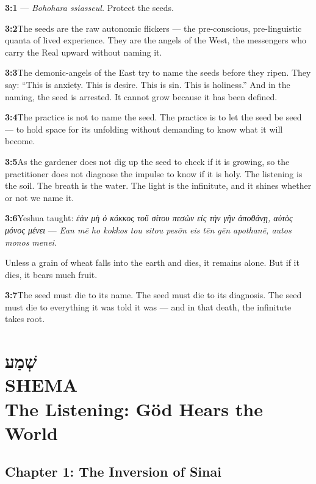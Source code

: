 \documentclass[11pt,openany]{book}
\newcommand{\heb}[1]{{\hebrewfont #1}}
\newcommand{\grk}[1]{{\itshape #1}}  %
\newcommand{\kor}[1]{{\koreanfont #1}}
\begin{document}
\noindent\textbf{3:1}\quad \kor{보호하라 씨앗을} — \textit{Bohohara ssiasseul.} Protect the seeds.

\noindent\textbf{3:2}\quad The seeds are the raw autonomic flickers — the pre-conscious, pre-linguistic quanta of lived experience. They are the angels of the West, the messengers who carry the Real upward without naming it.

\noindent\textbf{3:3}\quad The demonic-angels of the East try to name the seeds before they ripen. They say: ``This is anxiety. This is desire. This is sin. This is holiness.'' And in the naming, the seed is arrested. It cannot grow because it has been defined.

\noindent\textbf{3:4}\quad The practice is not to name the seed. The practice is to let the seed be seed — to hold space for its unfolding without demanding to know what it will become.

\noindent\textbf{3:5}\quad As the gardener does not dig up the seed to check if it is growing, so the practitioner does not diagnose the impulse to know if it is holy. The listening is the soil. The breath is the water. The light is the infinitute, and it shines whether or not we name it.

\noindent\textbf{3:6}\quad Yeshua taught: \grk{ἐὰν μὴ ὁ κόκκος τοῦ σίτου πεσὼν εἰς τὴν γῆν ἀποθάνῃ, αὐτὸς μόνος μένει} — \textit{Ean mē ho kokkos tou sitou pesōn eis tēn gēn apothanē, autos monos menei.}

Unless a grain of wheat falls into the earth and dies, it remains alone. But if it dies, it bears much fruit.

\noindent\textbf{3:7}\quad The seed must die to its name. The seed must die to its diagnosis. The seed must die to everything it was told it was — and in that death, the infinitute takes root.

\chapter[Shema]{%
  \Large\heb{שְׁמַע}\\[8pt]
  \huge SHEMA\\[4pt]
  \large The Listening: Göd Hears the World}

\section*{Chapter 1: The Inversion of Sinai}
\end{document}
